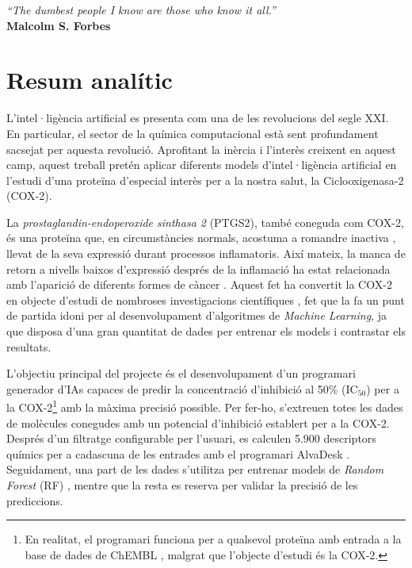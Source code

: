 \documentclass[11pt]{article}
\begin{document}
\restoregeometry
{}
\thispagestyle{empty}
\mbox{} 
\newpage
\thispagestyle{empty}
\vspace*{\fill} %
\begin{flushright}
    \emph{“The dumbest people I know are those who know it all.”}\\[1em]
    \textbf{Malcolm S. Forbes}
\end{flushright}
\vspace*{\fill} 
\newpage

\thispagestyle{afteres}
\setcounter{page}{1}
\section*{Resum analític}\par
L'intel·ligència artificial es presenta com una de les revolucions del segle XXI. En particular, el sector de la química computacional està sent profundament sacsejat per aquesta revolució. Aprofitant la inèrcia i l'interès creixent en aquest camp, aquest treball pretén aplicar diferents models d'intel·ligència artificial en l'estudi d'una proteïna d'especial interès per a la nostra salut, la Ciclooxigenasa-2 (COX-2).

La \emph{prostaglandin-endoperoxide sinthasa 2} (PTGS2), també coneguda com COX-2, és una proteïna que, en circumstàncies normals, acostuma a romandre inactiva \cite{Cox2Location}, llevat de la seva expressió durant processos inflamatoris. Així mateix, la manca de retorn a nivells baixos d'expressió després de la inflamació ha estat relacionada amb l'aparició de diferents formes de càncer \cite{DefinitionCOX2CancerDictionary}. Aquest fet ha convertit la COX-2 en objecte d'estudi de nombroses investigacions científiques \cite{Cox2InhibitorsReview}, fet que la fa un punt de partida idoni per al desenvolupament d'algoritmes de \emph{Machine Learning}, ja que disposa d'una gran quantitat de dades per entrenar els models i contrastar els resultats.

L'objectiu principal del projecte és el desenvolupament d'un programari generador d'IAs capaces de predir la concentració d'inhibició al 50\% (IC$_{50}$) per a la COX-2\footnote{En realitat, el programari funciona per a qualsevol proteïna amb entrada a la base de dades de ChEMBL \cite{ChemblDatabase}, malgrat que l'objecte d'estudi és la COX-2.} amb la màxima precisió possible. Per fer-ho, s'extreuen totes les dades de molècules conegudes amb un potencial d'inhibició establert per a la COX-2. Després d'un filtratge configurable per l'usuari, es calculen 5.900 descriptors químics per a cadascuna de les entrades amb el programari AlvaDesk \cite{MauriMolecularDescriptorsBook}\cite{AlvaDescSecondPaper}. Seguidament, una part de les dades s'utilitza per entrenar models de \emph{Random Forest} (RF) \cite{MachineLearningRandomForest}, mentre que la resta es reserva per validar la precisió de les prediccions.
\end{document}

